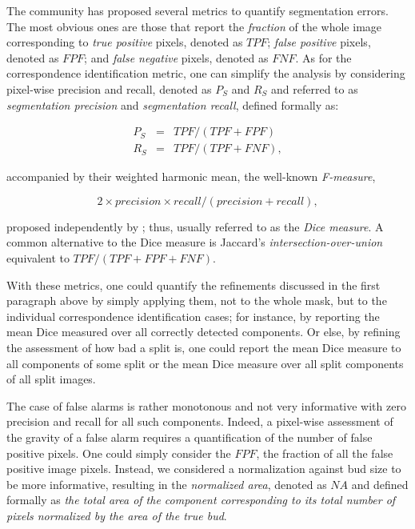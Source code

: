 \documentclass[a4paper,authoryear,review]{elsarticle}
\begin{document}
	The community has proposed several metrics to quantify segmentation errors. The most obvious ones are those that report the \emph{fraction} of the whole image corresponding to \emph{true positive} pixels, denoted as $TPF$; \emph{false positive} pixels,  denoted as $FPF$;  and \emph{false negative} pixels, denoted as $FNF$. As for the correspondence identification metric, one can simplify the analysis by considering pixel-wise precision and recall, denoted as  $P_S$ and $R_S$ and referred to as \emph{segmentation precision} and \emph{segmentation recall}, defined formally as: 
	
	\begin{eqnarray*} 
		P_S &=& TPF / (TPF + FPF) \\
		R_S &=& TPF / (TPF + FNF),
	\end{eqnarray*}
	
	accompanied by their weighted harmonic mean, the well-known \emph{F-measure}, 
	
	\begin{equation} 
	2 \times precision \times recall / (precision + recall),
	\end{equation}
	
	proposed independently by \citet{dice1945measures}; thus, usually referred to as the \emph{Dice measure}. A common alternative to the Dice measure is Jaccard’s \emph{intersection-over-union} \citep{jaccard1912distribution} equivalent to $TPF / (TPF+FPF+FNF)$. 
	
	With these metrics, one could quantify the refinements discussed in the first paragraph above by simply applying them, not to the whole mask, but to the individual correspondence identification cases; for instance, by reporting the mean Dice measured over all correctly detected components. Or else, by refining the assessment of how bad a split is, one could report the mean Dice measure to all components of some split or the mean Dice measure over all split components of all split images. 
	
	The case of false alarms is rather monotonous and not very informative with zero precision and recall for all such components. Indeed, a pixel-wise assessment of the gravity of a false alarm requires a quantification of the number of false positive pixels. One could simply consider the $FPF$, the fraction of all the false positive image pixels. Instead, we considered a normalization against bud size to be more informative, resulting in the \emph{normalized area}, denoted as $NA$ and defined formally as \emph{the total area of the component corresponding to its total number of pixels normalized by the area of the true bud}. 
	
\end{document}
